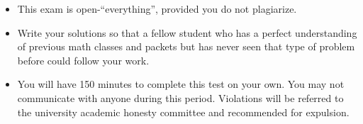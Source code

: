 \documentclass[12pt]{exam}
\newcommand{\<}{\langle}
\renewcommand{\>}{\rangle}
\begin{document}
\begin{center}
\end{center}
\vspace{0.1in}

\vspace{12pt}

\begin{itemize}
  \item This exam is open-``everything'', provided you do not plagiarize.
  \item Write your solutions so that a fellow student who has a perfect
        understanding of previous math classes and packets but
        has never seen that type of problem before could follow your work.
  \item You will have 150 minutes to complete this test
        on your own. You may not communicate with anyone during this period.
        Violations will be referred to the university academic honesty
        committee and recommended for expulsion.
\end{itemize}

\newpage
\end{document}
